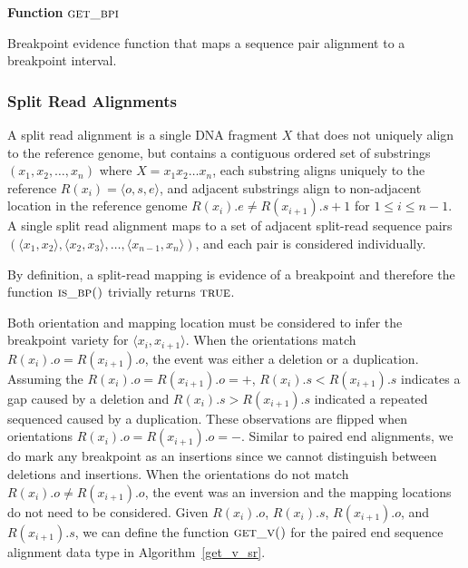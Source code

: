 \documentclass[11pt]{article}
\begin{document}
\begin{algorithm}[H]
    \DontPrintSemicolon
    \footnotesize
    \BlankLine
    \textbf{Function} $\textsc{get\_bpi}$\;
	\caption{Breakpoint evidence function that maps a sequence pair alignment to
			a breakpoint interval.}
    \label{get_bp}
\end{algorithm}



\subsubsection{Split Read Alignments}

A split read alignment is a single DNA fragment $X$ that does not uniquely align
to the reference genome, but contains a contiguous ordered set of substrings
$(x_1, x_2, \dots, x_n)$ where $X=x_1x_2\dots x_n$, each substring aligns
uniquely to the reference $R(x_i)=\langle o,s,e \rangle$, and adjacent
substrings align to non-adjacent location in the reference genome
$R(x_{i}).e \neq R(x_{i+1}).s + 1$ for $1\leq i \leq n-1$. A single split read
alignment maps to a set of adjacent split-read sequence pairs 
$(\langle x_1 , x_2 \rangle, \langle x_2, x_3 \rangle, \dots ,
\langle x_{n-1},x_n \rangle)$, and each pair is considered individually.

By definition, a split-read mapping is evidence of a breakpoint and therefore
the function $\textsc{is\_bp()}$ trivially returns $\textsc{true}$.

Both orientation and mapping location must be considered to infer the breakpoint
variety for $\langle x_i,x_{i+1} \rangle$.  When the orientations match
$R(x_{i}).o=R(x_{i+1}).o$, the event was either a deletion or
a duplication.  Assuming the $R(x_{i}).o=R(x_{i+1}).o=+$, 
$R(x_{i}).s<R(x_{i+1}).s$ indicates a gap caused by a deletion and 
$R(x_{i}).s>R(x_{i+1}).s$ indicated a repeated sequenced caused by a
duplication.   These observations are flipped when orientations
$R(x_{i}).o=R(x_{i+1}).o=-$.  Similar to paired end alignments, we do mark any
breakpoint as an insertions since we cannot distinguish between deletions and
insertions.  When the orientations do not match $R(x_{i}).o \ne R(x_{i+1}).o$,
the event was an inversion and the mapping locations do not need to be
considered.  Given $R(x_i).o$, $R(x_i).s$, $R(x_{i+1}).o$, and $R(x_{i+1}).s$,
we can define the function $\textsc{get\_v()}$ for the paired end sequence
alignment data type in Algorithm~\ref{get_v_sr}.
\end{document}
